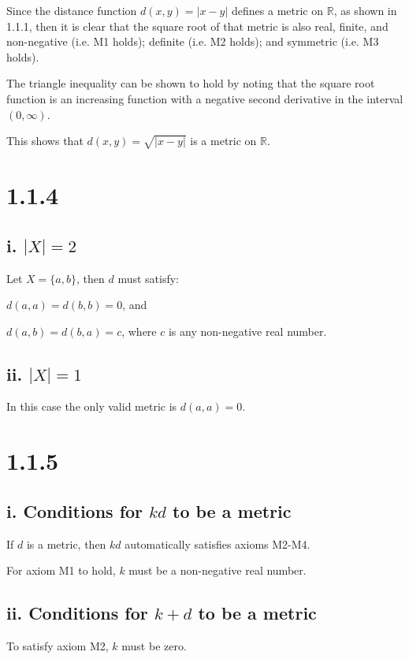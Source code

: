 \documentclass{article}
\begin{document}
Since the distance function $d(x,y) = |x-y|$ defines a metric on $\mathbb{R}$, as shown in 1.1.1, then it is clear that the square root of that metric is also real, finite, and non-negative (i.e. M1 holds); definite (i.e. M2 holds); and symmetric (i.e. M3 holds).
\newline

\noindent
The triangle inequality can be shown to hold by noting that the square root function is an increasing function with a negative second derivative in the interval $(0, \infty)$.
\newline

\noindent
This shows that $d(x,y) = \sqrt{|x-y|}$ is a metric on $\mathbb{R}$.


\section*{1.1.4}

\subsection*{i. $|X| = 2$}
Let $X = \{a,b\}$, then $d$ must satisfy:
\newline

$d(a,a) = d(b,b) = 0$, and


$d(a,b) = d(b,a) = c$, where $c$ is any non-negative real number.

\subsection*{ii. $|X| = 1$}
In this case the only valid metric is $d(a,a) = 0$.


\section*{1.1.5}
\subsection*{i. Conditions for $kd$ to be a metric}
If $d$ is a metric, then $kd$ automatically satisfies axioms M2-M4.
\newline

\noindent
For axiom M1 to hold, $k$ must be a non-negative real number.

\subsection*{ii. Conditions for $k+d$ to be a metric}
To satisfy axiom M2, $k$ must be zero.
\end{document}
